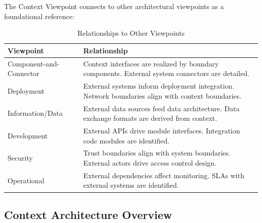 \documentclass[11pt,letterpaper]{article}
\begin{document}
The Context Viewpoint connects to other architectural viewpoints as a foundational reference:

\begin{table}[H]
\centering
\caption{Relationships to Other Viewpoints}
\begin{tabular}{@{}L{3.5cm}L{10.5cm}@{}}
\toprule
\textbf{Viewpoint} & \textbf{Relationship} \\
\midrule
Component-and-Connector & Context interfaces are realized by boundary components. External system connectors are detailed. \\
\addlinespace
Deployment & External systems inform deployment integration. Network boundaries align with context boundaries. \\
\addlinespace
Information/Data & External data sources feed data architecture. Data exchange formats are derived from context. \\
\addlinespace
Development & External APIs drive module interfaces. Integration code modules are identified. \\
\addlinespace
Security & Trust boundaries align with system boundaries. External actors drive access control design. \\
\addlinespace
Operational & External dependencies affect monitoring. SLAs with external systems are identified. \\
\bottomrule
\end{tabular}
\end{table}

\subsection{Context Architecture Overview}
\end{document}
